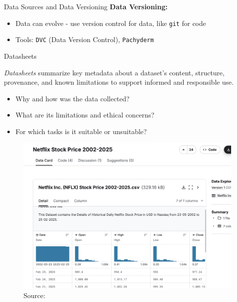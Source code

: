 \documentclass[10pt,compress,t,notes=noshow, xcolor=table]{beamer}
\begin{document}
\begin{frame}{Data Sources and Data Versioning}
\textbf{Data Versioning:}

\begin{itemize}
\item Data can evolve - use version control for data, like \texttt{git} for code  
\item Tools: \texttt{DVC} (Data Version Control), \texttt{Pachyderm}
\end{itemize}



\end{frame}





\begin{frame}{Datasheets }
\label{datasheets}

\emph{Datasheets} summarize key metadata about a dataset's content, structure, provenance, and known limitations to support informed and responsible use.

  \begin{itemize}
    \item Why and how was the data collected?
    \item What are its limitations and ethical concerns?
    \item For which tasks is it suitable or unsuitable?
  \end{itemize}

\begin{figure}
    \centering
    \includegraphics[width=0.6\linewidth]{figure_man/DataSheet.png}\\
\tiny Source: 
\end{figure}

\end{frame}
\end{document}

